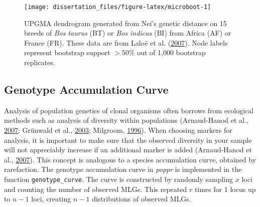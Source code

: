\documentclass[double,11pt]{beavtex}
\begin{document}
  \begin{Shaded}
  \begin{Highlighting}[]
  \NormalTok{(}\NormalTok{);}
  \NormalTok{(}\NormalTok{, } \NormalTok{);}
  \StringTok{ }\NormalTok{(}
  \StringTok{ }\ErrorTok{~}
  \StringTok{ }
  
  \NormalTok{(}\NormalTok{);}
  \StringTok{ } \NormalTok{, } \NormalTok{);}
  \end{Highlighting}
  \end{Shaded}
  
  \begin{figure}
  
  {\centering \texttt{[image: dissertation\_files/figure-latex/microboot-1]} 
  
  }
  
  \caption[UPGMA dendrogram generated from Nei's genetic distance]{UPGMA dendrogram generated from Nei's genetic distance on 15 breeds of
  \emph{Bos taurus} (BT) or \emph{Bos indicus} (BI) from Africa (AF) or
  France (FR). These data are from Laloë et al.
  (\protect\hyperlink{ref-laloe2007consensus}{2007}). Node labels
  represent bootstrap support \(>50\%\) out of 1,000 bootstrap replicates.}\label{fig:microboot}
  \end{figure}
  
  \subsection{Genotype Accumulation
  Curve}\label{genotype-accumulation-curve}
  
  Analysis of population genetics of clonal organisms often borrows from
  ecological methods such as analysis of diversity within populations
  (Arnaud-Hanod et al.,
  \protect\hyperlink{ref-arnaud2007standardizing}{2007}; Grünwald et al.,
  \protect\hyperlink{ref-grunwald2003analysis}{2003}; Milgroom,
  \protect\hyperlink{ref-milgroom1996recombination}{1996}). When choosing
  markers for analysis, it is important to make sure that the observed
  diversity in your sample will not appreciably increase if an additional
  marker is added (Arnaud-Hanod et al.,
  \protect\hyperlink{ref-arnaud2007standardizing}{2007}). This concept is
  analogous to a species accumulation curve, obtained by rarefaction. The
  genotype accumulation curve in \emph{poppr} is implemented in the
  function \texttt{genotype\_curve}. The curve is constructed by randomly
  sampling \(x\) loci and counting the number of observed MLGs. This
  repeated \(r\) times for 1 locus up to \(n-1\) loci, creating \(n-1\)
  distributions of observed MLGs.
  
\end{document}
